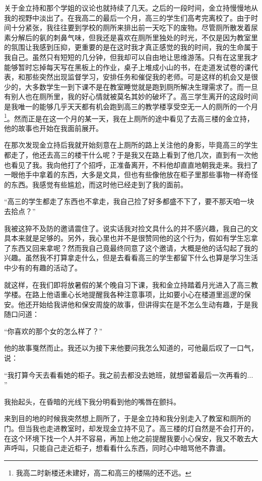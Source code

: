 \documentclass[UTF8,oneside]{ctexbook}
\begin{document}
关于金立持和那个学姐的议论也就持续了几天。之后的一段时间，金立持慢慢地从我的视野中淡出了。在我高二的最后一个月，高三的学生们高考完离校了。由于时间十分紧张，我往往要到学校的厕所来排出前一天吃下的废物。尽管厕所散发着尿素分解后的氨的刺鼻气味，但我还是喜欢在厕所里独处的时光，不仅是因为教室里的氛围让我感到压抑，更重要的是在这时我才真正感觉的我的时间，我的生命属于我自己。虽然只有短短的几分钟，但我却可以自由地让思维游荡。只有在这里我才能够暂时忘掉每天写在黑板上的作业，桌子上堆成小山的书，在走道发试卷的课代表，和那些突然出现监督学习，安排任务和催促我的老师。可是这样的机会又是很少的，大多数学生一到下课不是在教室睡觉就是跑到厕所解决生理需求了。而一旦有别人也在厕所里，我的好心情就被莫名其妙的破坏了。高三学生离开的这段时间是我唯一的能够几乎天天都有机会跑到高三的教学楼享受空无一人的厕所的一个月\footnote{我高二时新楼还未建好，高二和高三的楼隔的还不远。}。然而正是在这一个月的某一天，我在上厕所的途中看见了去高三楼的金立持，他的故事也开始在我面前展开。

在那次发现金立持后我就开始刻意在上厕所的路上关注他的身影，毕竟高三的学生都走了，他还去高三的楼干什么呢？于是我又在路上看到了他几次，直到有一次他也看见了我。我向他打了个招呼，正准备离开，不料他却直直地朝我走来。我扫了一眼他手中拿着的东西，大多是文具，但也有些像他放在柜子里那些事物一样奇怪的东西。我感觉有些尴尬，而这时他已经走到了我的面前。

``高三的学生都走了东西也不拿走，我自己捡了好多都盛不下了，要不那天咱一块去拾点？''

我被这猝不及防的邀请震住了。说实话我对捡文具什么的并不感兴趣，我自己的文具本来就是足够的。另外，我心里也并不是很赞同他的这个行为，假如有学生忘拿了东西又回来拿呢？然而我自己竟最终同意了这个邀请，大概是他的话勾起了我的兴趣。虽然我不打算拿走什么，但是去看看高三的学生都留下什么也算是学习生活中少有的有趣的活动了。

就这样，在我们即将放暑假的某个晚自习下课，我和金立持踏着月光进入了高三教学楼。在路上他语重心长地提醒我各种注意事项，比如要小心在楼道里巡逻的保安。他还开始给我讲他和保安周旋的故事，但讲得实在是不怎么生动有趣，于是我随口问道：

``你喜欢的那个女的怎么样了？''

他的故事戛然而止。我还以为接下来他要问我怎么知道的，可他最后叹了一口气，说：

``我打算今天去看看她的柜子。我之前去都没去她班，就想留着最后一次再看的... ''

我抬起头，在昏暗的光线下我分明看到他的嘴唇在颤抖。

来到目的地的时候我突然想上厕所了，于是金立持和我分别走入了教室和厕所的门。但当我也走进教室时，却发现金立持不见了。高三楼的灯自然是不会打开的，在这个环境下找一个人并不容易，再加上他之前提醒我要小心保安，我又不敢去大声呼叫，只能自己走近柜子，想看看什么东西，同时心中暗骂他不靠谱。
\end{document}
